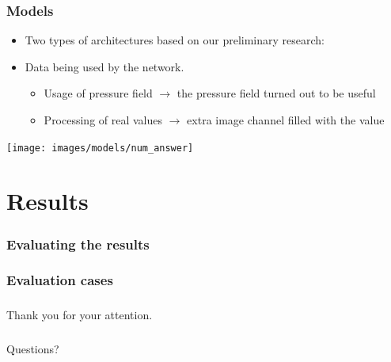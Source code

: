 \documentclass[18pt]{beamer}
\begin{document}
\begin{frame}[t]
  \frametitle{Models}
  \begin{itemize}
  \item Two types of architectures based on our preliminary research:
  \item Data being used by the network.
    \begin{itemize}
    \item Usage of pressure field $\rightarrow$ the pressure field turned out to be useful
    \item Processing of real values $\rightarrow$ extra image channel filled with the value
    \end{itemize}
  \end{itemize}

  \vspace{0.3cm}
    \begin{center}
    \texttt{[image: images/models/num\_answer]}
  \end{center}
  
\end{frame}

\section{Results}
\begin{frame}
  \frametitle{Evaluating the results}  
\end{frame}

\begin{frame}
  \frametitle{Evaluation cases}
\end{frame}

\begin{frame}
  \frametitle{}
  \begin{center}
    \huge{Thank you for your attention.}
  \end{center}
\end{frame}

\begin{frame}
  \frametitle{}
  \begin{center}
    \huge{Questions?}
  \end{center}
\end{frame}
\end{document}
